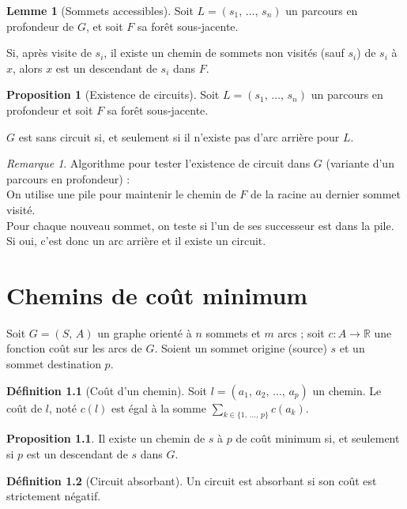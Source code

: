\documentclass[11pt,english,french]{scrreprt}
\theoremstyle{remark}
\newtheorem*{rem*}{Remarque}
\theoremstyle{definition}
\newtheorem*{def*}{Définition}
\newtheorem*{prop*}{Proposition}
\newtheorem*{lem*}{Lemme}
\begin{document}
\begin{lem*}[Sommets accessibles]
	Soit $L=(s_1,\,\dots,\,s_n)$ un parcours en profondeur de $G$, et soit $F$ sa forêt sous-jacente.
	
	Si, après visite de $s_i$, il existe un chemin de sommets non visités (sauf $s_i$) de $s_i$ à $x$, alors $x$ est un descendant de $s_i$ dans $F$. 
\end{lem*}

\begin{prop*}[Existence de circuits]
	Soit $L=(s_1,\,\dots,\,s_n)$ un parcours en profondeur et soit $F$ sa forêt sous-jacente.
	
	$G$ est sans circuit si, et seulement si il n'existe pas d'arc arrière pour $L$.
\end{prop*}

\begin{rem*}
	Algorithme pour tester l'existence de circuit dans $G$ (variante d'un parcours en profondeur) :\\
	On utilise une pile pour maintenir le chemin de $F$ de la racine au dernier sommet visité.\\
	Pour chaque nouveau sommet, on teste si l'un de ses successeur est dans la pile.\\
	Si oui, c'est donc un arc arrière et il existe un circuit.
\end{rem*}

\chapter{Chemins de coût minimum}

Soit $G=(S,\,A)$ un graphe orienté à $n$ sommets et $m$ arcs ; soit $c\colon A\longrightarrow \mathbb{R}$ une fonction coût sur les arcs de $G$. Soient un sommet origine (source) $s$ et un sommet destination $p$.

\begin{def*}[Coût d'un chemin]
	Soit $l=(a_1,\,a_2,\,\dots,\,a_p)$ un chemin. Le coût de $l$, noté $c(l)$ est égal à la somme $\sum_{k\in\{1,\,\dots,\,p\}}c(a_k)$.
\end{def*}

\begin{prop*}
	Il existe un chemin de $s$ à $p$ de coût minimum si, et seulement si $p$ est un descendant de $s$ dans $G$.	
\end{prop*}

\begin{def*}[Circuit absorbant]
	Un circuit est absorbant si son coût est strictement négatif.
\end{def*}
\end{document}
